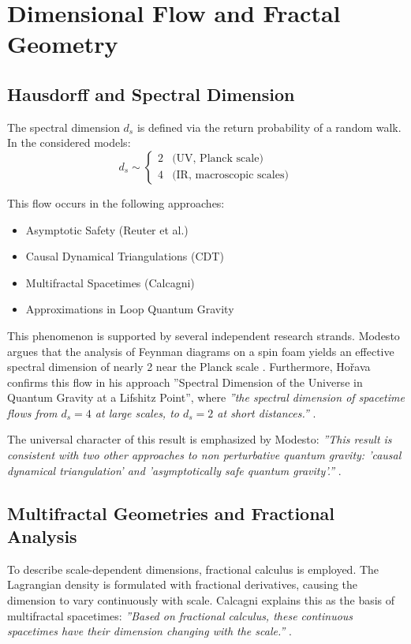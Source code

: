 	\section{Dimensional Flow and Fractal Geometry}
	
	\subsection{Hausdorff and Spectral Dimension}
	The spectral dimension $d_s$ is defined via the return probability of a random walk. In the considered models:
	\begin{equation}
		d_s \sim 
		\begin{cases} 
			2 & \text{(UV, Planck scale)} \\
			4 & \text{(IR, macroscopic scales)}
		\end{cases}
	\end{equation}
	
	This flow occurs in the following approaches:
	\begin{itemize}
		\item Asymptotic Safety (Reuter et al.)
		\item Causal Dynamical Triangulations (CDT)
		\item Multifractal Spacetimes (Calcagni)
		\item Approximations in Loop Quantum Gravity
	\end{itemize}
	
	This phenomenon is supported by several independent research strands. Modesto argues that the analysis of Feynman diagrams on a spin foam yields an effective spectral dimension of nearly 2 near the Planck scale \cite{Modesto2008}. Furthermore, Hořava confirms this flow in his approach ''Spectral Dimension of the Universe in Quantum Gravity at a Lifshitz Point'', where \textit{''the spectral dimension of spacetime flows from $d_s=4$ at large scales, to $d_s=2$ at short distances.''} \cite{Horava2009}.
	
	The universal character of this result is emphasized by Modesto: \textit{''This result is consistent with two other approaches to non perturbative quantum gravity: 'causal dynamical triangulation' and 'asymptotically safe quantum gravity'.''} \cite{Modesto2009}.
	
	\subsection{Multifractal Geometries and Fractional Analysis}
	To describe scale-dependent dimensions, fractional calculus is employed. The Lagrangian density is formulated with fractional derivatives, causing the dimension to vary continuously with scale. Calcagni explains this as the basis of multifractal spacetimes: \textit{''Based on fractional calculus, these continuous spacetimes have their dimension changing with the scale.''} \cite{Calcagni2012}.
	
